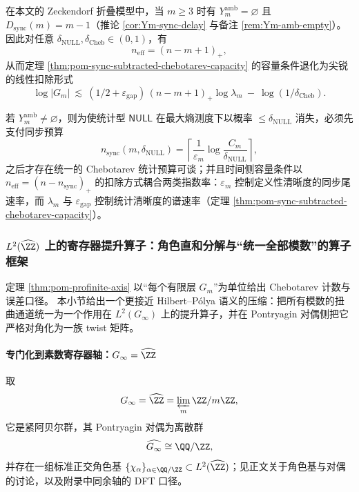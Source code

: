 \begin{corollary}\label{cor:pom-sync-subtracted-chebotarev-zeckendorf}
在本文的 Zeckendorf 折叠模型中，当 \(m\ge 3\) 时有 \(Y_m^{\mathrm{amb}}=\varnothing\) 且 \(D_{\mathrm{sync}}(m)=m-1\)（推论 \ref{cor:Ym-sync-delay} 与备注 \ref{rem:Ym-amb-empty}）。
因此对任意 \(\delta_{\mathrm{NULL}},\delta_{\mathrm{Cheb}}\in(0,1)\)，有
\[
n_{\mathrm{eff}}=(n-m+1)_+,
\]
从而定理 \ref{thm:pom-sync-subtracted-chebotarev-capacity} 的容量条件退化为尖锐的线性扣除形式
\[
\log |G_m|
\ \lesssim\
(1/2+\varepsilon_{\mathrm{gap}})\,(n-m+1)_+\log\lambda_m
\ -\
\log(1/\delta_{\mathrm{Cheb}}).
\]
\end{corollary}

\begin{corollary}[弱可逆情形的两参数预算]\label{cor:pom-sync-subtracted-chebotarev-weak}
若 \(Y_m^{\mathrm{amb}}\neq\varnothing\)，则为使统计型 \(\mathsf{NULL}\) 在最大熵测度下以概率 \(\le \delta_{\mathrm{NULL}}\) 消失，必须先支付同步预算
\[
n_{\mathrm{sync}}(m,\delta_{\mathrm{NULL}})
=\left\lceil \dfrac{1}{\varepsilon_m}\log\dfrac{C_m}{\delta_{\mathrm{NULL}}}\right\rceil,
\]
之后才存在统一的 Chebotarev 统计预算可谈；并且时间侧容量条件以 \(n_{\mathrm{eff}}=(n-n_{\mathrm{sync}})_+\) 的扣除方式耦合两类指数率：\(\varepsilon_m\) 控制定义性清晰度的同步尾速率，而 \(\lambda_m\) 与 \(\varepsilon_{\mathrm{gap}}\) 控制统计清晰度的谱速率（定理 \ref{thm:pom-sync-subtracted-chebotarev-capacity}）。
\end{corollary}

\subsubsection{\texorpdfstring{$L^2(\widehat{\ZZ})$}{L2(Zhat)} 上的寄存器提升算子：角色直和分解与“统一全部模数”的算子框架}\label{subsec:profinite-operator-l2}
定理 \ref{thm:pom-profinite-axis} 以“每个有限层 \(G_m\)”为单位给出 Chebotarev 计数与误差口径。
本小节给出一个更接近 Hilbert--P{\'o}lya 语义的压缩：把所有模数的扭曲通道统一为一个作用在 \(L^2(G_\infty)\) 上的提升算子，并在 Pontryagin 对偶侧把它严格对角化为一族 twist 矩阵。

\paragraph{专门化到素数寄存器轴：\texorpdfstring{$G_\infty=\widehat{\ZZ}$}{G=Zhat}}
取
\[
G_\infty=\widehat{\ZZ}=\varprojlim_m \ZZ/m\ZZ,
\]
它是紧阿贝尔群，其 Pontryagin 对偶为离散群
\[
\widehat{G_\infty}\cong \QQ/\ZZ,
\]
并存在一组标准正交角色基 \(\{\chi_\alpha\}_{\alpha\in\QQ/\ZZ}\subset L^2(\widehat{\ZZ})\)；见正文关于角色基与对偶的讨论，以及附录中同余轴的 DFT 口径。

